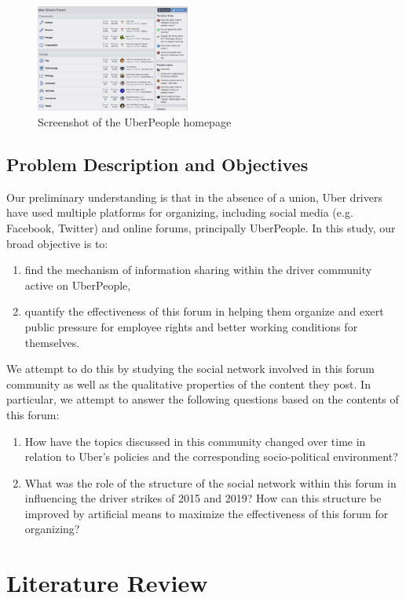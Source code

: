 \documentclass[10pt, twocolumn]{article}
\begin{document}
\begin{figure}
    \centering
    \includegraphics[width=0.45\textwidth]{img/home-screen-sample.png}
    \caption{Screenshot of the UberPeople homepage}
    \label{fig:home-screen-sample}
\end{figure}

\subsection{Problem Description and Objectives}
Our preliminary understanding is that in the absence of a union, Uber drivers have used multiple platforms for organizing, including social media (e.g. Facebook, Twitter) and online forums, principally UberPeople. In this study, our broad objective is to:
\begin{enumerate}
    \item find the mechanism of information sharing within the driver community active on UberPeople,
    \item quantify the effectiveness of this forum in helping them organize and exert public pressure for employee rights and better working conditions for themselves.
\end{enumerate}
We attempt to do this by studying the social network involved in this forum community as well as the qualitative properties of the content they post. In particular, we attempt to answer the following questions based on the contents of this forum:
\begin{enumerate}
    \item How have the topics discussed in this community changed over time in relation to Uber's policies and the corresponding socio-political environment?
    \item What was the role of the structure of the social network within this forum in influencing the driver strikes of 2015 and 2019? How can this structure be improved by artificial means to maximize the effectiveness of this forum for organizing?
\end{enumerate}

\section{Literature Review}
\end{document}
